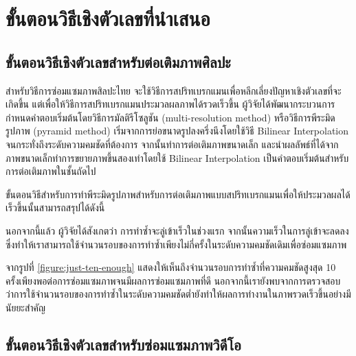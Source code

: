 \section{ขั้นตอนวิธีเชิงตัวเลขที่นำเสนอ}
\subsection{ขั้นตอนวิธีเชิงตัวเลขสำหรับต่อเติมภาพศิลปะ}

\hspace{1cm} สำหรับวิธีการซ่อมแซมภาพสิลปะไทย จะใช้วิธีการสปริทเบรกแมนเพื่อหลีกเลี่ยงปัญหาเชิงตัวเลขที่จะเกิดขึ้น แต่เพื่อให้วิธีการสปริทเบรกแมนประมวลผลภาพได้รวดเร็วขึ้น ผู้วิจัยได้พัฒนากระบวนการกำหนดคำตอบเริ่มต้นโดยวิธีการมัลติรีโซลูชัน (multi-resolution method) หรือวิธีการพีระมิดรูปภาพ (pyramid method) \cite{ref:image-pyramid}
เริ่มจากการย่อขนาดรูปลงครึ่งนึงโดยใช้วิธี Bilinear Interpolation จนกระทั่งถึงระดับความคมชัดที่ต้องการ จากนั้นทำการต่อเติมภาพขนาดเล็ก และนำผลลัพธ์ที่ได้จากภาพขนาดเล็กทำการขยายภาพขึ้นสองเท่าโดยใช้ Bilinear Interpolation เป็นคำตอบเริ่มต้นสำหรับการต่อเติมภาพในชั้นถัดไป

\hspace{1cm} ขั้นตอนวิธีสำหรับการทำพีระมิดรูปภาพสำหรับการต่อเติมภาพแบบสปริทเบรกแมนเพื่อให้ประมวลผลได้เร็วขึ้นนั้นสามารถสรุปได้ดังนี้\\




\vspace{0.5cm}



\hspace{1cm} นอกจากนี้แล้ว ผู้วิจัยได้สังเกตว่า การทำซ้ำจะลู่เข้าเร็วในช่วงแรก จากนั้นความเร็วในการลู่เข้าจะลดลง ซึ่งทำให้เราสามารถใช้จำนวนรอบของการทำซ้ำเพียงไม่กี่ครั้งในระดับความคมชัดเดิมเพื่อซ่อมแซมภาพ



\hspace{1cm} 
จากรูปที่ \ref{figure:just-ten-enough}
แสดงให้เห็นถึงจำนวนรอบการทำซ้ำที่ความคมชัดสูงสุด 10 ครั้งเพียงพอต่อการซ่อมแซมภาพจนมีผลการซ่อมแซมภาพที่ดี นอกจากนี้เรายังพบจากการตรวจสอบว่าการใช้จำนวนรอบของการทำซ้ำในระดับความคมชัดต่ำยังทำให้ผลการทำงานในภาพรวดเร็วขึ้นอย่างมีนัยยะสำคัญ

\subsection{ขั้นตอนวิธีเชิงตัวเลขสำหรับซ่อมแซมภาพวิดีโอ}

